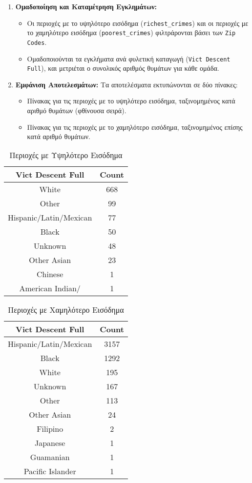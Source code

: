 \documentclass{article}
\begin{document}
\begin{enumerate}
    \item \textbf{Ομαδοποίηση και Καταμέτρηση Εγκλημάτων:}
    \begin{itemize}
        \item Οι περιοχές με το υψηλότερο εισόδημα (\texttt{richest\_crimes}) και οι περιοχές με το χαμηλότερο εισόδημα (\texttt{poorest\_crimes}) φιλτράρονται βάσει των \texttt{Zip Codes}.
        \item Ομαδοποιούνται τα εγκλήματα ανά φυλετική καταγωγή (\texttt{Vict Descent Full}), και μετριέται ο συνολικός αριθμός θυμάτων για κάθε ομάδα.
    \end{itemize}

    \item \textbf{Εμφάνιση Αποτελεσμάτων:}
    Τα αποτελέσματα εκτυπώνονται σε δύο πίνακες:
    \begin{itemize}
        \item Πίνακας για τις περιοχές με το υψηλότερο εισόδημα, ταξινομημένος κατά αριθμό θυμάτων (φθίνουσα σειρά).
        \item Πίνακας για τις περιοχές με το χαμηλότερο εισόδημα, ταξινομημένος επίσης κατά αριθμό θυμάτων.
    \end{itemize}
\end{enumerate}

\begin{table}[h!]
\centering
\caption{Περιοχές με Υψηλότερο Εισόδημα}
\begin{tabular}{|c|c|}
\hline
\textbf{Vict Descent Full} & \textbf{Count} \\
\hline
White & 668 \\
Other & 99 \\
Hispanic/Latin/Mexican & 77 \\
Black & 50 \\
Unknown & 48 \\
Other Asian & 23 \\
Chinese & 1 \\
American Indian/ & 1\\
\hline
\end{tabular}
\end{table}

\begin{table}[h!]
\centering
\caption{Περιοχές με Χαμηλότερο Εισόδημα}
\begin{tabular}{|c|c|}
\hline
\textbf{Vict Descent Full} & \textbf{Count} \\
\hline
Hispanic/Latin/Mexican & 3157 \\
Black & 1292 \\
White & 195 \\
Unknown & 167 \\
Other & 113 \\
Other Asian & 24 \\
Filipino & 2 \\
Japanese & 1 \\
Guamanian & 1 \\
Pacific Islander &1 \\
\hline
\end{tabular}
\end{table}
\end{document}
